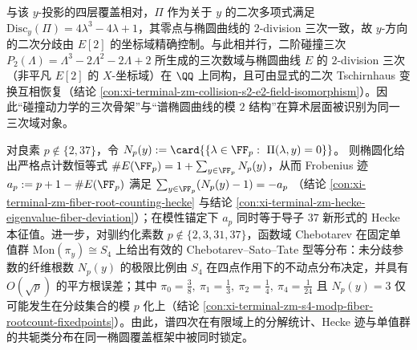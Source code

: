 \par
与该 \(y\)-投影的四层覆盖相对，\(\Pi\) 作为关于 \(y\) 的二次多项式满足 \(\mathrm{Disc}_{y}(\Pi)=4\lambda^3-4\lambda+1\)，其零点与椭圆曲线的 \(2\)-division 三次一致，故 \(y\)-方向的二次分歧由 \(E[2]\) 的坐标域精确控制。与此相并行，二阶碰撞三次
\(
P_2(\Lambda)=\Lambda^3-2\Lambda^2-2\Lambda+2
\)
所生成的三次数域与椭圆曲线 \(E\) 的 \(2\)-division 三次（非平凡 \(E[2]\) 的 \(X\)-坐标域）在 \(\QQ\) 上同构，且可由显式的二次 Tschirnhaus 变换互相恢复（结论 \ref{con:xi-terminal-zm-collision-s2-e2-field-isomorphism}）。因此“碰撞动力学的三次骨架”与“谱椭圆曲线的模 \(2\) 结构”在算术层面被识别为同一三次域对象。
\par
对良素 \(p\notin\{2,37\}\)，令
\(
N_p(y):=\card{\{\lambda\in\FF_p:\ \Pi(\lambda,y)=0\}}
\)。
则椭圆化给出严格点计数恒等式
\(
\#E(\FF_p)=1+\sum_{y\in\FF_p}N_p(y)
\)，从而 Frobenius 迹
\(
a_p:=p+1-\#E(\FF_p)
\)
满足
\(
\sum_{y\in\FF_p}(N_p(y)-1)=-a_p
\)
（结论 \ref{con:xi-terminal-zm-fiber-root-counting-hecke} 与结论 \ref{con:xi-terminal-zm-hecke-eigenvalue-fiber-deviation}）；在模性锚定下 \(a_p\) 同时等于导子 \(37\) 新形式的 Hecke 本征值。进一步，对驯约化素数 \(p\notin\{2,3,31,37\}\)，函数域 Chebotarev 在固定单值群 \(\mathrm{Mon}(\pi_y)\cong S_4\) 上给出有效的 Chebotarev--Sato--Tate 型等分布：未分歧参数的纤维根数 \(N_p(y)\) 的极限比例由 \(S_4\) 在四点作用下的不动点分布决定，并具有 \(O(\sqrt p)\) 的平方根误差；其中
\(
\pi_0=\tfrac38,\ \pi_1=\tfrac13,\ \pi_2=\tfrac14,\ \pi_4=\tfrac1{24}
\)
且 \(N_p(y)=3\) 仅可能发生在分歧集合的模 \(p\) 化上（结论 \ref{con:xi-terminal-zm-s4-modp-fiber-rootcount-fixedpoints}）。由此，谱四次在有限域上的分解统计、Hecke 迹与单值群的共轭类分布在同一椭圆覆盖框架中被同时锁定。
